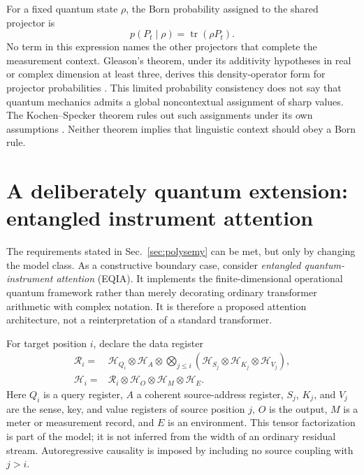 \documentclass[
  aps,
  reprint,
  superscriptaddress,
  floatfix,
  nofootinbib,
  longbibliography
]{revtex4-2}
\begin{document}
For a fixed quantum state $\rho$, the Born probability assigned to the shared
projector is
\begin{equation}
 p(P_t\mid\rho)=\operatorname{tr}(\rho P_t).
 \label{eq:born-shared-app}
\end{equation}
No term in this expression names the other projectors that complete the
measurement context.  Gleason's theorem, under its additivity hypotheses in
real or complex dimension at least three, derives this density-operator form
for projector probabilities \cite{Gleason}.  This limited probability
consistency does not say that quantum mechanics admits a global
noncontextual assignment of sharp values.  The Kochen--Specker theorem rules
out such assignments under its own assumptions \cite{specker-60,kochen1}.
Neither theorem implies that linguistic context should obey a Born rule.

\section{A deliberately quantum extension: entangled instrument attention}
\label{app:quantum-attention}

The requirements stated in Sec.~\ref{sec:polysemy} can be met, but only by
changing the model class.
As a constructive boundary case, consider \emph{entangled quantum-instrument
attention} (EQIA).  It implements the finite-dimensional operational quantum
framework rather than merely decorating ordinary transformer arithmetic with
complex notation.  It is therefore a proposed attention architecture, not a
reinterpretation of a standard transformer.

For target position $i$, declare the data register
\begin{equation}
\begin{aligned}
 \mathcal R_i={}&\mathcal H_{Q_i}\otimes\mathcal H_A
 \otimes\bigotimes_{j\leq i}
 \left(
 \mathcal H_{S_j}\otimes\mathcal H_{K_j}\otimes\mathcal H_{V_j}
 \right),\\
 \mathcal H_i={}&\mathcal R_i\otimes\mathcal H_O
 \otimes\mathcal H_M\otimes\mathcal H_E .
\end{aligned}
\label{eq:eqia-space}
\end{equation}
Here $Q_i$ is a query register, $A$ a coherent source-address register,
$S_j$, $K_j$, and $V_j$ are the sense, key, and value registers of source
position $j$, $O$ is the output, $M$ is a meter or measurement record, and
$E$ is an environment.  This tensor factorization is part of the model; it is
not inferred from the width of an ordinary residual stream.  Autoregressive
causality is imposed by including no source coupling with $j>i$.
\end{document}

